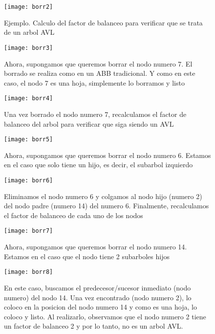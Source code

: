 \documentclass[10pt,a4paper]{article}
\begin{document}
\begin{figure}[h]
	\centering
	\texttt{[image: borr2]}
	\caption{Ejemplo. Calculo del factor de balanceo para verificar que se trata de un arbol AVL}
	\label{drivers1}
\end{figure}

\begin{figure}[h]
	\centering
	\texttt{[image: borr3]}
	\caption{Ahora, supongamos que queremos borrar el nodo numero 7. El borrado se realiza como en un ABB tradicional. Y como en este caso, el nodo 7 es una hoja, simplemente lo borramos y listo}
	\label{drivers1}
\end{figure}

\begin{figure}[h]
	\centering
	\texttt{[image: borr4]}
	\caption{Una vez borrado el nodo numero 7, recalculamos el factor de balanceo del arbol para verificar que siga siendo un AVL}
	\label{drivers1}
\end{figure}
\newpage

\begin{figure}[h]
	\centering
	\texttt{[image: borr5]}
	\caption{Ahora, supongamos que queremos borrar el nodo numero 6. Estamos en el caso que solo tiene un hijo, es decir, el subarbol izquierdo}
	\label{drivers1}
\end{figure}

\begin{figure}[h]
	\centering
	\texttt{[image: borr6]}
	\caption{Eliminamos el nodo numero 6 y colgamos al nodo hijo (numero 2) del nodo padre (numero 14) del numero 6. Finalmente, recalculamos el factor de balanceo de cada uno de los nodos}
	\label{drivers1}
\end{figure}

\begin{figure}[h]
	\centering
	\texttt{[image: borr7]}
	\caption{Ahora, supongamos que queremos borrar el nodo numero 14. Estamos en el caso que el nodo tiene 2 subarboles hijos}
	\label{drivers1}
\end{figure}
\newpage

\begin{figure}[h]
	\centering
	\texttt{[image: borr8]}
	\caption{En este caso, buscamos el predecesor/sucesor inmediato (nodo numero) del nodo 14. Una vez encontrado (nodo numero 2), lo coloco en la posicion del nodo numero 14 y como es una hoja, lo coloco y listo.
		\newline
		\newline
		Al realizarlo, observamos que el nodo numero 2 tiene un factor de balanceo 2 y por lo tanto, no es un arbol AVL.}
	\label{drivers1}
\end{figure}
\end{document}
